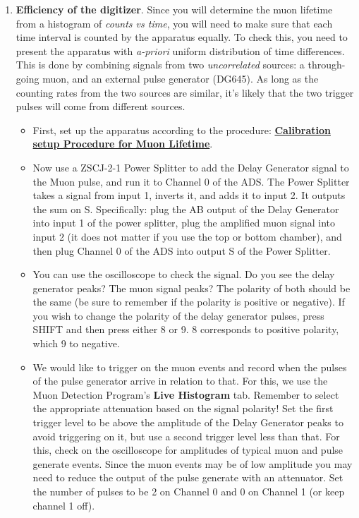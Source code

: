 \documentclass{../lab}
\begin{document}
\begin{enumerate}
\noindent {}
    
    \item \textbf{Efficiency of the digitizer}. Since you will determine the muon lifetime from a histogram of \emph{counts vs time}, you will need to make sure that each time interval is counted by the apparatus equally. To check this, you need to present the apparatus with \emph{a-priori} uniform distribution of time differences. This is done by combining signals from two \emph{uncorrelated} sources: a through-going muon, and an external pulse generator (DG645). As long as the counting rates from the two sources are similar, it's likely that the two trigger pulses will come from different sources.

    \begin{itemize}
        \item First, set up the apparatus according to the procedure: \href{https://berkeley-physics111b.github.io/appendices/MUO-Calibration/}{\textbf{Calibration setup Procedure for Muon Lifetime}}.

        \item Now use a ZSCJ-2-1 Power Splitter to add the Delay Generator signal to the Muon pulse, and run it to Channel 0 of the ADS. The Power Splitter takes a signal from input 1, inverts it, and adds it to input 2. It outputs the sum on S. Specifically: plug the AB output of the Delay Generator into input 1 of the power splitter, plug the amplified muon signal into input 2 (it does not matter if you use the top or bottom chamber), and then plug Channel 0 of the ADS into output S of the Power Splitter.

        \item You can use the oscilloscope to check the signal. Do you see the delay generator peaks? The muon signal peaks? The polarity of both should be the same (be sure to remember if the polarity is positive or negative). If you wish to change the polarity of the delay generator pulses, press SHIFT and then press either 8 or 9. 8 corresponds to positive polarity, which 9 to negative.

        \item We would like to trigger on the muon events and record when the pulses of the pulse generator arrive in relation to that. For this, we use the Muon Detection Program's \textbf{Live Histogram} tab. Remember to select the appropriate attenuation based on the signal polarity! 
        Set the first trigger level to be above the amplitude of the Delay Generator peaks to avoid triggering on it, but use a second trigger level less than that. For this, check on the oscilloscope for amplitudes of typical muon and pulse generate events. Since the muon events may be of low amplitude you may need to reduce the output of the pulse generate with an attenuator.  Set the number of pulses to be 2 on Channel 0 and 0 on Channel 1 (or keep channel 1 off).


\end{itemize}
\end{enumerate}
\end{document}
